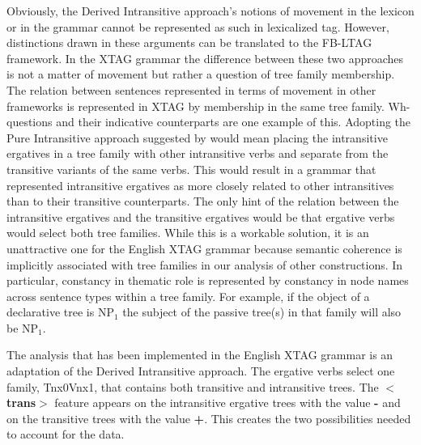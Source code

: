 Obviously, the Derived Intransitive approach's notions of movement in the
lexicon or in the grammar cannot be represented as such in lexicalized tag.
However, distinctions drawn in these arguments can be translated to the FB-LTAG
framework.  In the XTAG grammar the difference between these two approaches is
not a matter of movement but rather a question of tree family membership.  The
relation between sentences represented in terms of movement in other frameworks
is represented in XTAG by membership in the same tree family. Wh-questions and
their indicative counterparts are one example of this.  Adopting the Pure
Intransitive approach suggested by \cite{Napoli88} would mean placing the
intransitive ergatives in a tree family with other intransitive verbs and
separate from the transitive variants of the same verbs.  This would result in
a grammar that represented intransitive ergatives as more closely related to
other intransitives than to their transitive counterparts.  The only hint of
the relation between the intransitive ergatives and the transitive ergatives
would be that ergative verbs would select both tree families. While
this is a workable solution, it is an unattractive one for the English XTAG
grammar because semantic coherence is implicitly associated with tree families
in our analysis of other constructions.  In particular, constancy in thematic
role is represented by constancy in node names across sentence types within a
tree family. For example, if the object of a declarative tree is NP$_{1}$ the
subject of the passive tree(s) in that family will also be NP$_{1}$.

The analysis that has been implemented in the English XTAG grammar is an
adaptation of the Derived Intransitive approach. The ergative verbs select one
family, Tnx0Vnx1, that contains both transitive and intransitive trees.  The
{\bf$<$trans$>$} feature appears on the intransitive ergative trees with the
value {\bf -} and on the transitive trees with the value {\bf +}.  This
creates the two possibilities needed to account for the data.

